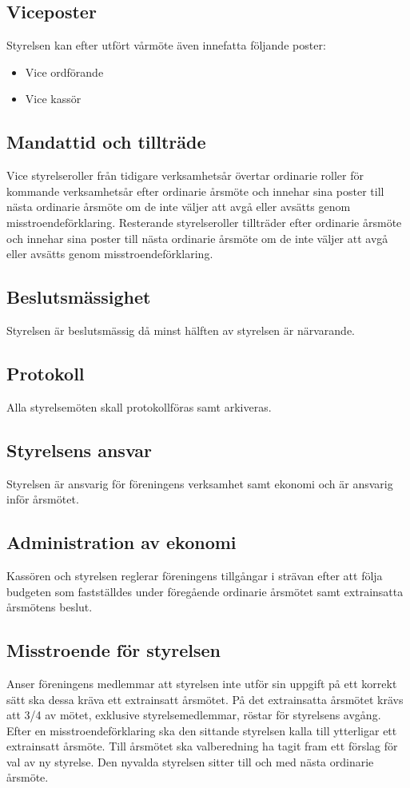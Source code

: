 \documentclass[11pt,a4paper]{article}
\begin{document}
\subsection{Viceposter}
Styrelsen kan efter utfört vårmöte även innefatta följande poster:
\begin{itemize}
\item Vice ordförande
\item Vice kassör
\end{itemize}
\subsection{Mandattid och tillträde}
Vice styrelseroller från tidigare verksamhetsår övertar ordinarie roller för kommande verksamhetsår efter ordinarie årsmöte och innehar sina poster till nästa ordinarie årsmöte om de inte väljer att avgå eller avsätts genom misstroendeförklaring. Resterande styrelseroller tillträder efter ordinarie årsmöte och innehar sina poster till
nästa ordinarie årsmöte om de inte väljer att avgå eller avsätts genom
misstroendeförklaring.
\subsection{Beslutsmässighet}
Styrelsen är beslutsmässig då minst hälften av styrelsen är närvarande.
\subsection{Protokoll}
Alla styrelsemöten skall protokollföras samt arkiveras. 
\subsection{Styrelsens ansvar}
Styrelsen är ansvarig för  föreningens verksamhet samt ekonomi och är ansvarig inför årsmötet.
\subsection{Administration av ekonomi}
Kassören och styrelsen reglerar föreningens tillgångar i strävan efter att
följa budgeten som fastställdes under föregående ordinarie årsmötet samt
extrainsatta årsmötens beslut.
\subsection{Misstroende för styrelsen}
Anser föreningens medlemmar att
styrelsen inte utför sin uppgift på ett korrekt sätt ska dessa kräva ett
extrainsatt årsmötet. På det extrainsatta årsmötet krävs att 3/4 av mötet,
exklusive styrelsemedlemmar, röstar för styrelsens avgång.
Efter en misstroendeförklaring ska den sittande styrelsen kalla till
ytterligar ett extrainsatt årsmöte. Till årsmötet ska valberedning ha tagit
fram ett förslag för val av ny styrelse. Den nyvalda
styrelsen sitter till och med nästa ordinarie årsmöte.
\end{document}
